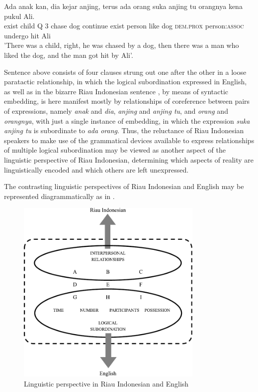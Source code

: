 \documentclass[output=paper,colorlinks,citecolor=brown
]{langscibook}
\begin{document}
\ea \label{ex:gil:9}
\gll Ada	anak	kan,	dia	kejar	anjing,	terus	ada	orang	suka	anjing	tu orangnya	kena	pukul	Ali. \\
    exist	child	Q	3	chase	dog	continue	exist	person	like	dog \textsc{dem.prox} person:\textsc{assoc}	undergo	hit	Ali\\
\glt 		'There was a child, right, he was chased by a dog, then there was a man who liked the dog, and the man got hit by Ali'.
\z

Sentence  above consists of four clauses strung out one after the other in a loose paratactic relationship, in which the logical subordination expressed in English, as well as in the bizarre Riau Indonesian sentence , by means of syntactic embedding, is here manifest mostly by relationships of coreference between pairs of expressions, namely \textit{anak} and \textit{dia}, \textit{anjing} and \textit{anjing tu}, and \textit{orang} and \textit{orangnya}, with just a single instance of embedding, in which the expression \textit{suka anjing tu} is subordinate to \textit{ada orang}.  Thus, the reluctance of Riau Indonesian speakers to make use of the grammatical devices available to express relationships of multiple logical subordination may be viewed as another aspect of the linguistic perspective of Riau Indonesian, determining which aspects of reality are linguistically encoded and which others are left unexpressed.

The contrasting linguistic perspectives of Riau Indonesian and English may be represented diagrammatically as in .

\begin{figure}
\centering
\includegraphics[width=0.8\textwidth]{gil_figure4.pdf}
\caption{\label{fig:gil:fig4}Linguistic perspective in Riau Indonesian and English}
\end{figure}
\end{document}
